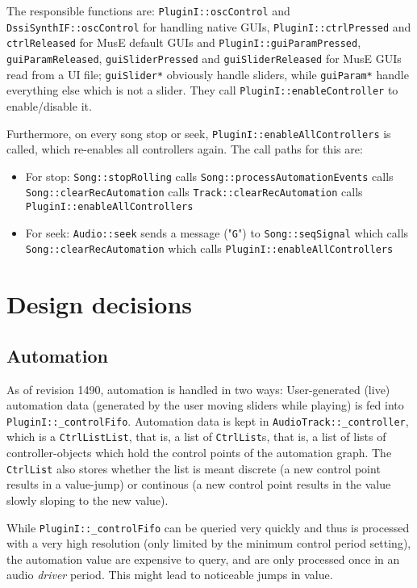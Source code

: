 \documentclass[a4paper]{report}
\begin{document}
The responsible functions are: \texttt{PluginI::oscControl} and
\texttt{DssiSynthIF::oscControl} for handling native GUIs,
\texttt{PluginI::ctrlPressed} and \texttt{ctrlReleased} for MusE
default GUIs and \texttt{PluginI::guiParamPressed},
\texttt{guiParamReleased}, \texttt{guiSliderPressed} and
\texttt{guiSliderReleased} for MusE GUIs read from a UI file;
\texttt{guiSlider*} obviously handle sliders, while \texttt{guiParam*}
handle everything else which is not a slider. They call
\texttt{PluginI::enableController} to enable/disable it.

Furthermore, on every song stop or seek, \texttt{PluginI::enableAllControllers}
is called, which re-enables all controllers again. The call paths for
this are:
\begin{itemize}
\item For stop: \texttt{Song::stopRolling} calls
                \texttt{Song::processAutomationEvents} calls
                \texttt{Song::clearRecAutomation} calls
                \texttt{Track::clearRecAutomation} calls
                \texttt{PluginI::enableAllControllers}
\item For seek: \texttt{Audio::seek} sends a message ("\texttt{G}") to
                \texttt{Song::seqSignal} which calls
                \texttt{Song::clearRecAutomation} which calls
                \texttt{PluginI::enableAllControllers}                
\end{itemize}




\chapter{Design decisions}
\section{Automation}
As of revision 1490, automation is handled in two ways: User-generated
(live) automation data (generated by the user moving sliders while playing)
is fed into \texttt{PluginI::\_controlFifo}. Automation data is kept
in \texttt{AudioTrack::\_controller}, which is a \texttt{CtrlListList},
that is, a list of \texttt{CtrlList}s, that is, a list of lists of
controller-objects which hold the control points of the automation graph.
The \texttt{CtrlList} also stores whether the list is meant discrete
(a new control point results in a value-jump) or continous (a new control
point results in the value slowly sloping to the new value).

While \texttt{PluginI::\_controlFifo} can be queried very quickly and
thus is processed with a very high resolution (only limited by the
minimum control period setting), the automation value are expensive to
query, and are only processed once in an audio \emph{driver} period.
This might lead to noticeable jumps in value.
\end{document}
